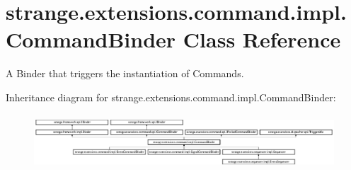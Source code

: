 \hypertarget{classstrange_1_1extensions_1_1command_1_1impl_1_1_command_binder}{\section{strange.\-extensions.\-command.\-impl.\-Command\-Binder Class Reference}
\label{classstrange_1_1extensions_1_1command_1_1impl_1_1_command_binder}
}


A Binder that triggers the instantiation of Commands.  


Inheritance diagram for strange.\-extensions.\-command.\-impl.\-Command\-Binder\-:\begin{figure}[H]
\begin{center}
\leavevmode
\includegraphics[height=2.052786cm]{classstrange_1_1extensions_1_1command_1_1impl_1_1_command_binder}
\end{center}
\end{figure}

